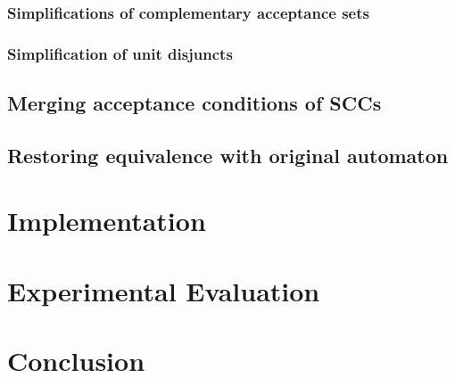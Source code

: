 \documentclass[
  digital, %
  twoside, %
  table,   %
  lof,     %
  lot,     %
]{fithesis3}
\begin{document}
\subsection{Simplifications of complementary acceptance sets}

\subsection{Simplification of unit disjuncts}

\section{Merging acceptance conditions of SCCs}

\section{Restoring equivalence with original automaton}


\chapter{Implementation}


\chapter{Experimental Evaluation}


\chapter{Conclusion}



\printbibliography[heading=bibintoc]
\end{document}
